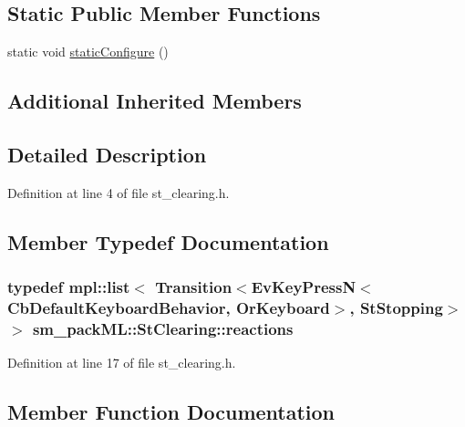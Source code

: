 \subsection*{Static Public Member Functions}
\begin{DoxyCompactItemize}
\item 
static void \hyperlink{structsm__packML_1_1StClearing_acd7cf3e047cae7daba192b77210b5591}{static\+Configure} ()
\end{DoxyCompactItemize}
\subsection*{Additional Inherited Members}


\subsection{Detailed Description}


Definition at line 4 of file st\+\_\+clearing.\+h.



\subsection{Member Typedef Documentation}
\subsubsection[{\texorpdfstring{reactions}{reactions}}]{\setlength{\rightskip}{0pt plus 5cm}typedef mpl\+::list$<$ Transition$<$Ev\+Key\+PressN$<$Cb\+Default\+Keyboard\+Behavior, {\bf Or\+Keyboard}$>$, {\bf St\+Stopping}$>$ $>$ {\bf sm\+\_\+pack\+M\+L\+::\+St\+Clearing\+::reactions}}\hypertarget{structsm__packML_1_1StClearing_a1c516812d5940546adb93b06b446a2be}{}\label{structsm__packML_1_1StClearing_a1c516812d5940546adb93b06b446a2be}


Definition at line 17 of file st\+\_\+clearing.\+h.



\subsection{Member Function Documentation}
